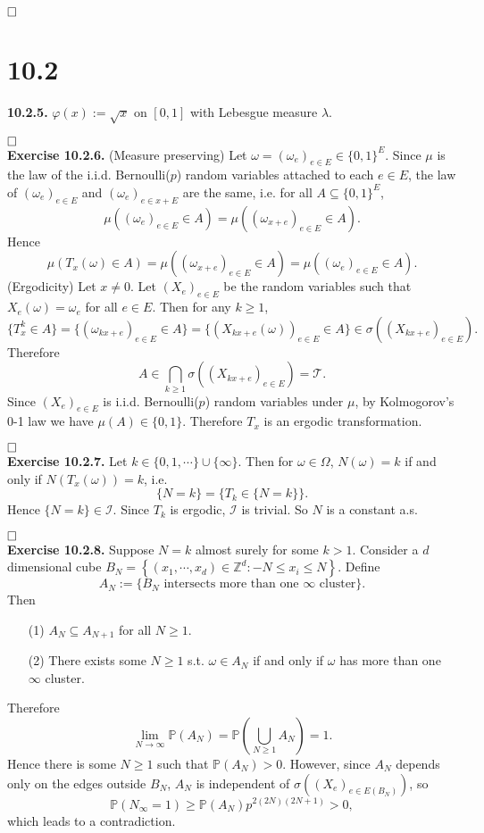 \documentclass[12pt]{extarticle}
\begin{document}
$\hspace{\fill}\square$
\\
\newpage

\section*{10.2}
\textbf{10.2.5.} $\varphi(x):=\sqrt{x}$ on $[0,1]$ with Lebesgue measure $\lambda$.

$\hspace{\fill}\square$\\
\textbf{Exercise 10.2.6.} (Measure preserving) Let $\omega=(\omega_e)_{e\in E}\in\{0,1\}^E$.
Since $\mu$ is the law of the i.i.d. Bernoulli($p$) random variables attached to each $e\in E$, the law of $(\omega_e)_{e\in E}$ and $(\omega_{e})_{e\in x+E}$ are the same, i.e. for all $A\subseteq \{0,1\}^E$,
\[
\mu((\omega_e)_{e\in E}\in A)=\mu((\omega_{x+e})_{e\in E}\in A).
\]
Hence
\[
\mu(T_x(\omega)\in A)=
\mu((\omega_{x+e})_{e\in E}\in A)
=
\mu((\omega_e)_{e\in E}\in A).
\]
(Ergodicity)
Let $x\neq 0$. Let $(X_e)_{e\in E}$ be the random variables such that $X_e(\omega)=\omega_e$ for all $e\in E$.
Then for any $k\geq 1$,
\[
\{T_x^k\in A\}=\{(\omega_{kx+e})_{e\in E}\in A\}=\{(X_{kx+e}(\omega))_{e\in E}\in A\}\in \sigma((X_{kx+e})_{e\in E}).
\]
Therefore
\[
A\in\bigcap_{k\geq 1}\sigma((X_{kx+e})_{e\in E})=\mathcal{T}.
\]
Since $(X_e)_{e\in E}$ is i.i.d. Bernoulli($p$) random variables under $\mu$, by Kolmogorov's 0-1 law we have $\mu(A)\in\{0,1\}$.
Therefore $T_x$ is an ergodic transformation.

$\hspace{\fill}\square$\\
\textbf{Exercise 10.2.7.}
Let $k\in\{0,1,\cdots\}\cup\{\infty\}$.
Then for $\omega\in\Omega$,
$N(\omega)=k$ if and only if $N(T_x(\omega))=k$, i.e.
\[
\{N=k\}=\{T_k\in\{N=k\}\}.
\]
Hence $\{N=k\}\in\mathcal{I}$. Since $T_k$ is ergodic, $\mathcal{I}$ is trivial. So $N$ is a constant a.s.

$\hspace{\fill}\square$\\
\textbf{Exercise 10.2.8.}
Suppose $N=k$ almost surely for some $k>1$.
Consider a $d$ dimensional cube $B_N=\left\{(x_1,\cdots,x_d)\in\mathbb{Z}^d:-N\leq x_i\leq N\right\}$.
Define
\[
A_N:=\{B_N\text{ intersects more than one $\infty$ cluster}\}.
\]
Then
\begin{enumerate}
\item[(1)] $A_N\subseteq A_{N+1}$ for all $N\geq 1$.
\item[(2)] There exists some $N\geq 1$ s.t. $\omega\in A_N$ if and only if $\omega$ has more than one $\infty$ cluster.
\end{enumerate}
Therefore
\[
\lim_{N\rightarrow\infty}\mathbb{P}(A_N)=\mathbb{P}\left(\bigcup_{N\geq 1}A_N\right)=1.
\]
Hence there is some $N\geq 1$ such that $\mathbb{P}(A_N)>0$.
However, since $A_N$ depends only on the edges outside $B_N$, $A_N$ is independent of $\sigma\left((X_e)_{e\in E(B_N)}\right)$, so
\[
\mathbb{P}(N_\infty=1)\geq\mathbb{P}(A_N)p^{2(2N)(2N+1)}>0,
\]
which leads to a contradiction.
\end{document}
